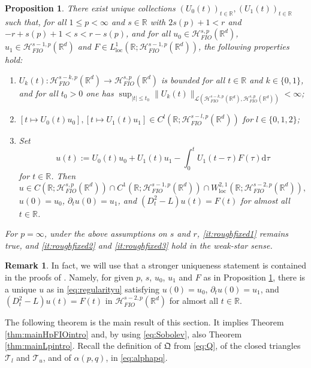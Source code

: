 \documentclass{amsart}
\numberwithin{equation}{section}
\newtheorem{proposition}[theorem]{Proposition}
\theoremstyle{definition}
\newtheorem{remark}[theorem]{Remark}
\newcommand{\R}{\mathbb{R}}
\newcommand {\HT}{\mathcal{H}}
\newcommand {\Hps}{\mathcal{H}^{s,p}_{FIO}(\R^d)}
\newcommand {\Hpsm}{\mathcal{H}^{s-1,p}_{FIO}(\R^d)}
\newcommand {\La}{\mathcal{L}}
\newcommand {\loc}{\mathrm{loc}}
\newcommand {\ud}{\mathrm{d}}
\begin{document}
\begin{proposition}\label{prop:roughfixed}
There exist unique collections $(U_{0}(t))_{t\in\R},(U_{1}(t))_{t\in\R}$ such that, for all $1\leq p<\infty$ and $s\in\R$ with $2s(p)+1<r$ and $-r+s(p)+1< s< r-s(p)$, and for all $u_{0}\in\Hps$, $u_{1}\in \Hpsm$ and $F\in L^{1}_{\loc}(\R;\Hpsm)$, the following properties hold:
\begin{enumerate}
\item\label{it:roughfixed1} $U_{k}(t):\HT^{s-k,p}_{FIO}(\R^d)\to\Hps$ is bounded for all $t\in\R$ and $k\in\{0,1\}$, and for all $t_{0}>0$ one has $\sup_{|t|\leq t_{0}}\|U_{k}(t)\|_{\La(\HT^{s-k,p}_{FIO}(\R^d),\Hps)}<\infty$; 
\item\label{it:roughfixed2} $[t\mapsto U_{0}(t)u_{0}],[t\mapsto U_{1}(t)u_{1}]\in C^{l}(\R;\HT^{s-l,p}_{FIO}(\R^d))$ for $l\in\{0,1,2\}$;
\item\label{it:roughfixed3} Set 
\begin{equation}\label{eq:defsol}
u(t):=U_{0}(t)u_{0}+U_{1}(t)u_{1}-\int_{0}^{t}U_{1}(t-\tau)F(\tau)\ud \tau
\end{equation}
for $t\in\R$. Then 
\begin{equation}\label{eq:regularityu}
u\in C(\R;\Hps)\cap C^{1}(\R;\Hpsm)\cap W^{2,1}_{\loc}(\R;\HT^{s-2,p}_{FIO}(\R^d)),
\end{equation}
$u(0)=u_{0}$, $\partial_{t}u(0)=u_{1}$, and $(D_{t}^{2}-L)u(t)=F(t)$ %
for almost all $t\in \R$.
\end{enumerate}
For $p=\infty$, under the above assumptions on $s$ and $r$, \eqref{it:roughfixed1} remains true, and \eqref{it:roughfixed2} and \eqref{it:roughfixed3} hold in the weak-star sense. 
\end{proposition}

\begin{remark}\label{rem:unique}
In fact, we will use that a stronger uniqueness statement is contained in the proofs of \cite[Theorem 4.7 and Corollary 4.13]{LiRoSo25a}. Namely, for given $p$, $s$, $u_{0}$, $u_{1}$ and $F$ as in Proposition \ref{prop:roughfixed}, there is a unique $u$ as in \eqref{eq:regularityu} satisfying $u(0)=u_{0}$, $\partial_{t}u(0)=u_{1}$, and $(D_{t}^{2}-L)u(t)=F(t)$ in $\HT^{s-2,p}_{FIO}(\R^d)$ for almost all $t\in \R$.
\end{remark}

The following theorem is the main result of this section. It implies Theorem \ref{thm:mainHpFIOintro} and, by using \eqref{eq:Sobolev}, 
also Theorem \ref{thm:mainLpintro}. Recall the definition of $\mathfrak{Q}$ from \eqref{eq:Q}, of the closed triangles $\mathcal{T}_{l}$ and $\mathcal{T}_{u}$, and of $\alpha(p,q)$, in \eqref{eq:alphapq}. 
\end{document}
